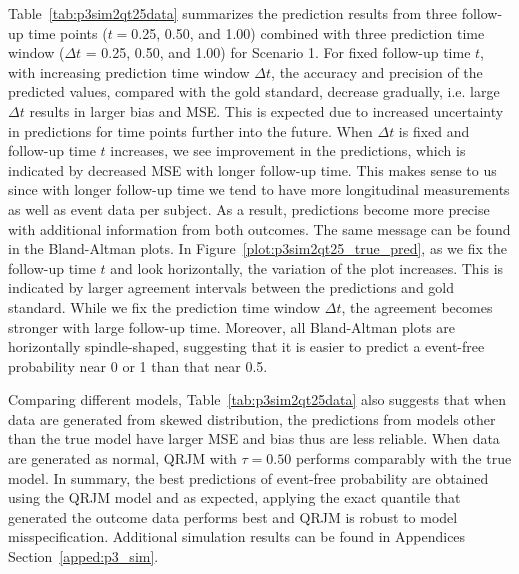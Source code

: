 Table~\ref{tab:p3sim2qt25data} summarizes the prediction results from three follow-up time points ($t=$0.25, 0.50, and 1.00) combined with three prediction time window ($\Delta t$ = 0.25, 0.50, and 1.00) for Scenario 1. For fixed follow-up time $t$, with increasing prediction time window $\Delta t$, the accuracy and precision of the predicted values, compared with the gold standard, decrease gradually, i.e. large $\Delta t$ results in larger bias and MSE. This is expected due to increased uncertainty  in predictions for time points further into the future. When $\Delta t$ is fixed and follow-up time $t$ increases, we see improvement in the predictions, which is indicated by decreased MSE with longer follow-up time. This makes sense to us since with longer follow-up time we tend to have more longitudinal measurements as well as event data per subject. As a result, predictions become more precise with additional information from both outcomes. The same message can be found in the Bland-Altman plots. In Figure~\ref{plot:p3sim2qt25_true_pred}, as we fix the follow-up time $t$ and look horizontally, the variation of the plot increases. This is indicated by larger agreement intervals between the predictions and gold standard. While we fix the prediction time window $\Delta t$, the agreement becomes stronger with large follow-up time. Moreover, all Bland-Altman plots are horizontally spindle-shaped, suggesting that it is easier to predict a event-free probability near 0 or 1 than that near 0.5.

Comparing different models, Table~\ref{tab:p3sim2qt25data} also suggests that when data are generated from skewed distribution, the predictions from models other than the true model have larger MSE and bias thus are less reliable. When data are generated as normal, QRJM with $\tau=0.50$ performs comparably with the true model. In summary, the best predictions of event-free probability are obtained using the QRJM model and as expected, applying the exact quantile that generated the outcome data performs best and QRJM is robust to model misspecification. Additional simulation results can be found in Appendices Section~\ref{apped:p3_sim}.


